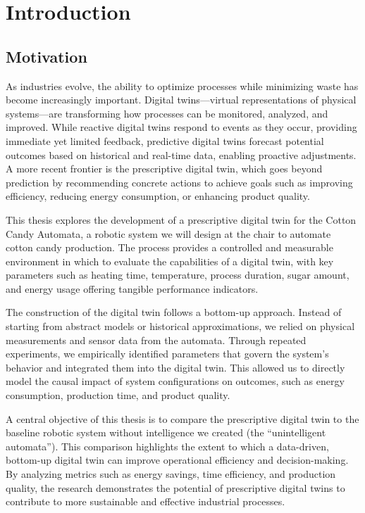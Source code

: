 \chapter{Introduction}
\label{sec:intro}

\section{Motivation}
\label{sec:intro:mo}

As industries evolve, the ability to optimize processes while minimizing waste has become increasingly important. Digital twins—virtual representations of physical systems—are transforming how processes can be monitored, analyzed, and improved. While reactive digital twins respond to events as they occur, providing immediate yet limited feedback, predictive digital twins forecast potential outcomes based on historical and real-time data, enabling proactive adjustments. A more recent frontier is the prescriptive digital twin, which goes beyond prediction by recommending concrete actions to achieve goals such as improving efficiency, reducing energy consumption, or enhancing product quality.

This thesis explores the development of a prescriptive digital twin for the Cotton Candy Automata, a robotic system we will design at the chair to automate cotton candy production. The process provides a controlled and measurable environment in which to evaluate the capabilities of a digital twin, with key parameters such as heating time, temperature, process duration, sugar amount, and energy usage offering tangible performance indicators.

The construction of the digital twin follows a bottom-up approach. Instead of starting from abstract models or historical approximations, we relied on physical measurements and sensor data from the automata. Through repeated experiments, we empirically identified parameters that govern the system's behavior and integrated them into the digital twin. This allowed us to directly model the causal impact of system configurations on outcomes, such as energy consumption, production time, and product quality.

A central objective of this thesis is to compare the prescriptive digital twin to the baseline robotic system without intelligence we created (the “unintelligent automata”). This comparison highlights the extent to which a data-driven, bottom-up digital twin can improve operational efficiency and decision-making. By analyzing metrics such as energy savings, time efficiency, and production quality, the research demonstrates the potential of prescriptive digital twins to contribute to more sustainable and effective industrial processes.

